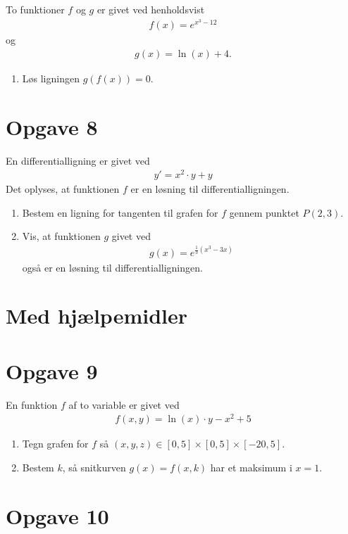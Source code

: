 \documentclass[12pt]{article}
\begin{document}
To funktioner $f$ og $g$ er givet ved henholdsvist 
\begin{align*}
	f(x) = e^{x^3-12}
\end{align*}
og 
\begin{align*}
	g(x) = \ln(x)+4.
\end{align*}

\begin{enumerate}[label=\roman*)]
	\item Løs ligningen $g(f(x)) = 0$.
\end{enumerate}

\section*{Opgave 8}
En differentialligning er givet ved
	\begin{align*}
		y' = x^2\cdot y + y
	\end{align*}
	Det oplyses, at funktionen $f$ er en løsning til differentialligningen.
\begin{enumerate}[label=\roman*)]
	\item Bestem en ligning for tangenten til grafen for $f$ gennem punktet $P(2,3)$.
	\item Vis, at funktionen $g$ givet ved 
	\begin{align*}
		g(x) = e^{\frac{1}{3}(x^3-3x)}
	\end{align*}
	også er en løsning til differentialligningen.
\end{enumerate}

\newpage
\section*{Med hjælpemidler}
\section*{Opgave 9}

En funktion $f$ af to variable er givet ved
\begin{align*}
	f(x,y) = \ln(x)\cdot y - x^2 + 5
\end{align*}
\begin{enumerate}[label=\roman*)]
	\item Tegn grafen for $f$ så $(x,y,z)\in [0,5]\times [0,5]\times [-20,5]$.
	\item Bestem $k$, så snitkurven $g(x) = f(x,k)$ har et maksimum i $x=1$. 
\end{enumerate}

\section*{Opgave 10}
\end{document}
